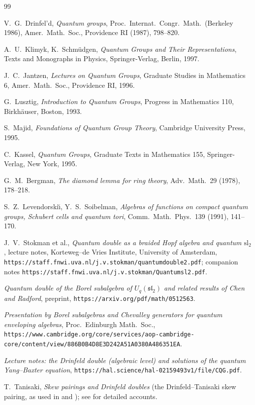 \documentclass[11pt]{amsart}
\theoremstyle{definition}
\begin{document}
\begin{thebibliography}{99}\small

 V.~G.~Drinfel'd, \emph{Quantum groups}, Proc.\ Internat.\ Congr.\
Math.\ (Berkeley 1986), Amer.\ Math.\ Soc., Providence RI (1987), 798--820.

 A.~U.~Klimyk, K.~Schm\"udgen, \emph{Quantum Groups and Their
Representations}, Texts and Monographs in Physics, Springer-Verlag, Berlin,
1997.

 J.~C.~Jantzen, \emph{Lectures on Quantum Groups}, Graduate
Studies in Mathematics 6, Amer.\ Math.\ Soc., Providence RI, 1996.

 G.~Lusztig, \emph{Introduction to Quantum Groups}, Progress in
Mathematics 110, Birkh\"auser, Boston, 1993.

 S.~Majid, \emph{Foundations of Quantum Group Theory},
Cambridge University Press, 1995.

 C.~Kassel, \emph{Quantum Groups}, Graduate Texts in Mathematics
155, Springer-Verlag, New York, 1995.

 G.~M.~Bergman, \emph{The diamond lemma for ring theory}, Adv.\
Math.\ 29 (1978), 178--218.

 S.~Z.~Levendorski\u\i, Y.~S.~Soibelman, \emph{Algebras of
functions on compact quantum groups, Schubert cells and quantum tori},
Comm.\ Math.\ Phys.\ 139 (1991), 141--170.

 J.~V.~Stokman et al., \emph{Quantum double as a braided Hopf
algebra and quantum $\mathrm{sl}_2$}, lecture notes, Korteweg--de Vries
Institute, University of Amsterdam,
\texttt{https://staff.fnwi.uva.nl/j.v.stokman/quantumdouble2.pdf};
companion notes
\texttt{https://staff.fnwi.uva.nl/j.v.stokman/Quantumsl2.pdf}.

 \emph{Quantum double of the Borel subalgebra of $U_q(\mathfrak{sl}_2)$
and related results of Chen and Radford}, preprint,
\texttt{https://arxiv.org/pdf/math/0512563}.

 \emph{Presentation by Borel subalgebras and Chevalley generators
for quantum enveloping algebras}, Proc.\ Edinburgh Math.\ Soc.,
\texttt{https://www.cambridge.org/core/services/aop-cambridge-core/content/view/886B0B4D8E3D242A51A0380A486351EA}.

\bibitem{hal} \emph{Lecture notes: the Drinfeld double (algebraic level) and
solutions of the quantum Yang--Baxter equation},
\texttt{https://hal.science/hal-02159493v1/file/CQG.pdf}.

 T.~Tanisaki, \emph{Skew pairings and Drinfeld doubles} (the
Drinfeld--Tanisaki skew pairing, as used in \cite{KS} and \cite{UvA});
see \cite{KS,UvA} for detailed accounts.

\end{thebibliography}
\end{document}
